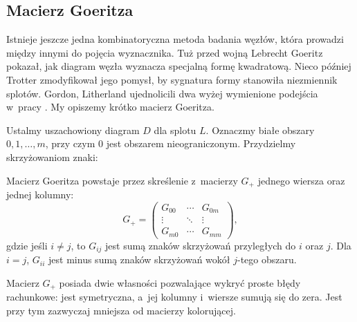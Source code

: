 
\subsection{Macierz Goeritza}
%
Istnieje jeszcze jedna kombinatoryczna metoda badania węzłów, która prowadzi między innymi do pojęcia wyznacznika.
Tuż przed wojną Lebrecht Goeritz pokazał, jak diagram węzła wyznacza specjalną formę kwadratową.
%
Nieco później Trotter zmodyfikował jego pomysł, by sygnatura formy stanowiła niezmiennik splotów.
%
Gordon, Litherland ujednolicili dwa wyżej wymienione podejścia w~pracy \cite{litherland81}.
%
%
My opiszemy krótko macierz Goeritza.

Ustalmy uszachowiony diagram $D$ dla splotu $L$.
%
Oznaczmy białe obszary $0, 1, \ldots, m$, przy czym $0$ jest obszarem nieograniczonym.
Przydzielmy skrzyżowaniom znaki:
\begin{comment}
\begin{figure}[H]
    \begin{minipage}[b]{.48\linewidth}
    \centering
    \LargePlusCrossingChessboard
    \end{minipage}
    \begin{minipage}[b]{.48\linewidth}
    \centering
    \LargeMinusCrossingChessboard
    \end{minipage}
\end{figure}
\end{comment}

\begin{definition}
    Macierz Goeritza powstaje przez skreślenie z~macierzy $G_+$ jednego wiersza oraz jednej kolumny:
    \begin{equation}
        G_+=\begin{pmatrix}
        G_{00} & \cdots & G_{0m} \\
        \vdots & \ddots & \vdots \\
        G_{m0} & \cdots & G_{mm}
        \end{pmatrix},
    \end{equation}
    gdzie jeśli $i\neq j$, to $G_{ij}$ jest sumą znaków skrzyżowań przyległych do $i$ oraz $j$.
    Dla $i = j$, $G_{ii}$ jest minus sumą znaków skrzyżowań wokół $j$-tego obszaru.
\end{definition}

Macierz $G_+$ posiada dwie własności pozwalające wykryć proste błędy rachunkowe: jest symetryczna, a~jej kolumny i~wiersze sumują się do zera.
Jest przy tym zazwyczaj mniejsza od macierzy kolorującej.


